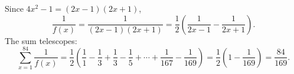 Since $4x^2-1=(2x-1)(2x+1)$,
\[
\dfrac{1}{f(x)}=\dfrac{1}{(2x-1)(2x+1)}=\dfrac{1}{2}\left(\dfrac{1}{2x-1}-\dfrac{1}{2x+1}\right).
\]
The sum telescopes:
\[
\sum_{x=1}^{84}\dfrac{1}{f(x)}=\dfrac{1}{2}\left(\dfrac{1}{1}-\dfrac{1}{3}+\dfrac{1}{3}-\dfrac{1}{5}+\cdots+\dfrac{1}{167}-\dfrac{1}{169}\right)=\dfrac{1}{2}\left(1-\dfrac{1}{169}\right)=\boxed{\dfrac{84}{169}}.
\]
